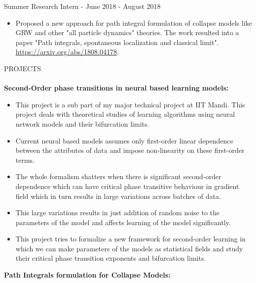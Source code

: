 \documentclass[a4paper]{article}
\newcommand{\lineunder} {
    \vspace*{-8pt} \\
    \hspace*{-18pt} \hrulefill \\
}
\newcommand{\header} [1] {
    {\hspace*{-18pt}\vspace*{6pt} \textsc{#1}}
    \vspace*{-6pt} \lineunder
}
\begin{document}
{Summer Research Intern - June 2018 - August 2018} \\
\begin{itemize}
\item Proposed a new approach for path integral formulation of collapse models like GRW and other "all particle dynamics" theories. The work resulted into a paper "Path integrals, spontaneous localization and classical limit". \url{https://arxiv.org/abs/1808.04178}.
\end{itemize}
\newpage
\header{PROJECTS}
\textbf{Second-Order phase transitions in neural based learning models: }\\
\begin{itemize}
    \item This project is a sub part of my major technical project at IIT Mandi. This project deals with theoretical studies of learning algorithms using neural network models and their bifurcation limits.
    \item Current neural based models assumes only first-order linear dependence between the attributes of data and impose non-linearity on these first-order terms.
    \item The whole formalism shatters when there is significant second-order dependence which can have critical phase transitive behaviour in gradient field which in turn results in large variations across batches of data.
    \item This large variations results in just addition of random noise to the parameters of the model and affects learning of the model significantly.
    \item This project tries to formalize a new framework for second-order learning in which we can make parameters of the models as statistical fields and study their critical phase transition exponents and bifurcation limits.
\end{itemize}
\vspace*{2mm}
\textbf{Path Integrals formulation for Collapse Models: }\\
\end{document}

